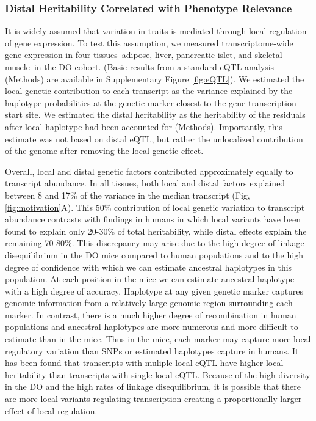 \documentclass[
]{article}
\begin{document}
\subsubsection{Distal Heritability Correlated with Phenotype
Relevance}\label{distal-heritability-correlated-with-phenotype-relevance}

It is widely assumed that variation in traits is mediated through local
regulation of gene expression. To test this assumption, we measured
transcriptome-wide gene expression in four tissues--adipose, liver,
pancreatic islet, and skeletal muscle--in the DO cohort. (Basic results
from a standard eQTL analysis \cite{pmid30591514} (Methods) are
available in Supplementary Figure \ref{fig:eQTL}). We estimated the
local genetic contribution to each transcript as the variance explained
by the haplotype probabilities at the genetic marker closest to the gene
transcription start site. We estimated the distal heritability as the
heritability of the residuals after local haplotype had been accounted
for (Methods). Importantly, this estimate was not based on distal eQTL,
but rather the unlocalized contribution of the genome after removing the
local genetic effect.

Overall, local and distal genetic factors contributed approximately
equally to transcript abundance. In all tissues, both local and distal
factors explained between 8 and 17\% of the variance in the median
transcript (Fig, \ref{fig:motivation}A). This 50\% contribution of local
genetic variation to transcript abundance contrasts with findings in
humans in which local variants have been found to explain only 20-30\%
of total heritability, while distal effects explain the remaining
70-80\%\cite{pmid31558840, pmid21383966}. This discrepancy may arise due
to the high degree of linkage disequilibrium in the DO mice compared to
human populations and to the high degree of confidence with which we can
estimate ancestral haplotypes in this population. At each position in
the mice we can estimate ancestral haplotype with a high degree of
accuracy. Haplotype at any given genetic marker captures genomic
information from a relatively large genomic region surrounding each
marker. In contrast, there is a much higher degree of recombination in
human populations and ancestral haplotypes are more numerous and more
difficult to estimate than in the mice. Thus in the mice, each marker
may capture more local regulatory variation than SNPs or estimated
haplotypes capture in humans. It has been found that transcripts with
muliple local eQTL have higher local heritability than transcripts with
single local eQTL\cite{pmid25010687}. Because of the high diversity in
the DO and the high rates of linkage disequilibrium, it is possible that
there are more local variants regulating transcription creating a
proportionally larger effect of local regulation.
\end{document}
